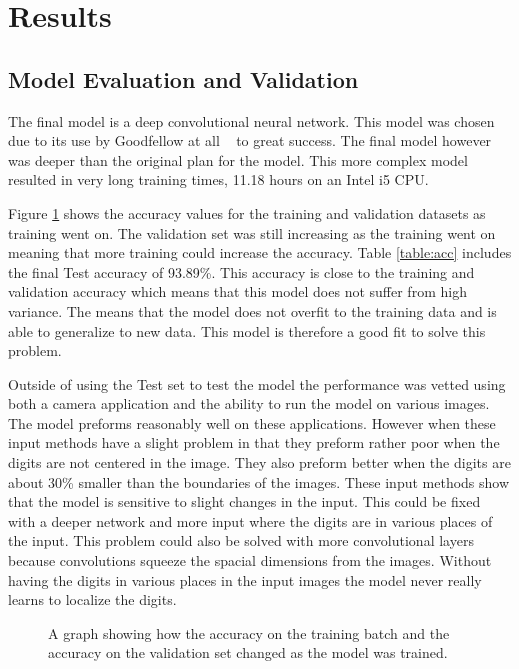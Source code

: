 \documentclass[12pt,twocolumn,letterpaper]{article}
\begin{document}
\section{Results}
\subsection{Model Evaluation and Validation}

The final model is a deep convolutional neural network. This model was chosen due 
to its use by Goodfellow at all ~\cite{goodfellow} to great success. The final 
model however was deeper than the original plan for the model. This more complex
model resulted in very long training times, 11.18 hours on an Intel i5 CPU.

Figure \ref{fig:accuracy} shows the accuracy values for the training and validation 
datasets as training went on. The validation set was still increasing as the training
went on meaning that more training could increase the accuracy. Table \ref{table:acc}
includes the final Test accuracy of 93.89\%. This accuracy is close to the 
training and validation accuracy which means that this model does not suffer from 
high variance. The means that the model does not overfit to the training data and 
is able to generalize to new data. This model is therefore a good fit to solve 
this problem.

Outside of using the Test set to test the model the performance was vetted using 
both a camera application and the ability to run the model on various images. The 
model preforms reasonably well on these applications. However when these input 
methods have a slight problem in that they preform rather poor when the digits 
are not centered in the image. They also preform better when the digits are about
30\% smaller than the boundaries of the images. These input methods show that the 
model is sensitive to slight changes in the input. This could be fixed with a 
deeper network and more input where the digits are in various places of the input.
This problem could also be solved with more convolutional layers because 
convolutions squeeze the spacial dimensions from the images. Without having the 
digits in various places in the input images the model never really learns to 
localize the digits.

\begin{figure}[t]
\begin{center}
\end{center}
   \caption{A graph showing how the accuracy on the training batch and the 
   accuracy on the validation set changed as the model was trained.}
\label{fig:accuracy}
\end{figure}
\end{document}

